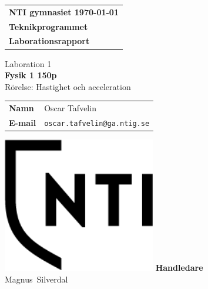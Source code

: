 \documentclass[11p, titlepage, oneside, a4paper]{article}
\makeatletter
\def\inst{Teknikprogrammet}
\def\typeofdoc{Laborationsrapport}
\def\course{Fysik 1 150p}
\def\pretitle{Laboration 1}
\def\title{Rörelse: Hastighet och acceleration}
\def\name{Oscar Tafvelin}
\def\username{oscar.tafvelin}
\def\email{\username{}@ga.ntig.se}
\def\graders{Magnus Silverdal}
\makeatother
\begin{document}
\begin{titlepage}
		\thispagestyle{empty}
		\begin{large}
			\begin{tabular}{@{}p{\textwidth}@{}}
				\textbf{NTI gymnasiet \hfill \today} \\
				\textbf{\inst} \\
				\textbf{\typeofdoc} \\
			\end{tabular}
		\end{large}
		\vspace{10mm}
		\begin{center}
			\LARGE{\pretitle} \\
			\huge{\textbf{\course}}\\
			\vspace{10mm}
			\LARGE{\title} \\
			\vspace{15mm}
			\begin{large}
				\begin{tabular}{ll}
					\textbf{Namn} & \name \\
					\textbf{E-mail} & \texttt{\email} \\
				\end{tabular}
			\end{large}
			\vfill
            \includegraphics[width=0.5\textwidth]{images/NTI Gymnasiet_Symbol_print_svart.png}
			\vfill
            \large{\textbf{Handledare}}\\
			\mbox{\large{\graders}}
		\end{center}
	\end{titlepage}

    \begin{otherlanguage}{english}
	\begin{abstract}
        We were given the task to calculate the speed and acceleration of a wagon rolling down an incline. To do this we used a real life model that we rolled down a small incline and then used a program called "Tracker" on physlets.org to calculate the distance traveled and the amount of time it took to travel that distance. The program measured the distance and time and printed out measurements for both of these. We then took those values and put them into the formulas for speed and acceleration.
    \end{abstract}
    \end{otherlanguage}
	\tableofcontents
	
\end{document}
